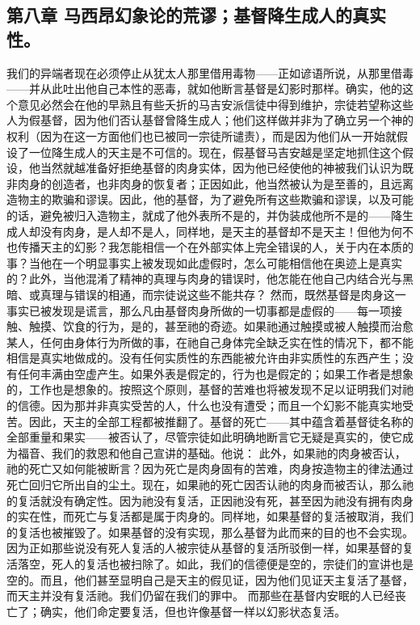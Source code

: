
\subsection{第八章 马西昂幻象论的荒谬；基督降生成人的真实性。}

我们的异端者现在必须停止从犹太人那里借用毒物——正如谚语所说，从那里借毒——并从此吐出他自己本性的恶毒，就如他断言基督是幻影时那样。确实，他的这个意见必然会在他的早熟且有些夭折的马吉安派信徒中得到维护，宗徒若望称这些人为假基督，因为他们否认基督曾降生成人；他们这样做并非为了确立另一个神的权利（因为在这一方面他们也已被同一宗徒所谴责），而是因为他们从一开始就假设了一位降生成人的天主是不可信的。现在，假基督马吉安越是坚定地抓住这个假设，他当然就越准备好拒绝基督的肉身实体，因为他已经使他的神被我们认识为既非肉身的创造者，也非肉身的恢复者；正因如此，他当然被认为是至善的，且远离造物主的欺骗和谬误。因此，他的基督，为了避免所有这些欺骗和谬误，以及可能的话，避免被归入造物主，就成了他外表所不是的，并伪装成他所不是的——降生成人却没有肉身，是人却不是人，同样地，是天主的基督却不是天主！但他为何不也传播天主的幻影？我怎能相信一个在外部实体上完全错误的人，关于内在本质的事？当他在一个明显事实上被发现如此虚假时，怎么可能相信他在奥迹上是真实的？此外，当他混淆了精神的真理与肉身的错误时，他怎能在他自己内结合光与黑暗、或真理与错误的相通，而宗徒说这些不能共存？ 然而，既然基督是肉身这一事实已被发现是谎言，那么凡由基督肉身所做的一切事都是虚假的——每一项接触、触摸、饮食的行为，是的，甚至祂的奇迹。如果祂通过触摸或被人触摸而治愈某人，任何由身体行为所做的事，在祂自己身体完全缺乏实在性的情况下，都不能相信是真实地做成的。没有任何实质性的东西能被允许由非实质性的东西产生；没有任何丰满由空虚产生。如果外表是假定的，行为也是假定的；如果工作者是想象的，工作也是想象的。按照这个原则，基督的苦难也将被发现不足以证明我们对祂的信德。因为那并非真实受苦的人，什么也没有遭受；而且一个幻影不能真实地受苦。因此，天主的全部工程都被推翻了。基督的死亡——其中蕴含着基督徒名称的全部重量和果实——被否认了，尽管宗徒如此明确地断言它无疑是真实的，使它成为福音、我们的救恩和他自己宣讲的基础。他说： 此外，如果祂的肉身被否认，祂的死亡又如何能被断言？因为死亡是肉身固有的苦难，肉身按造物主的律法通过死亡回归它所出自的尘土。现在，如果祂的死亡因否认祂的肉身而被否认，那么祂的复活就没有确定性。因为祂没有复活，正因祂没有死，甚至因为祂没有拥有肉身的实在性，而死亡与复活都是属于肉身的。同样地，如果基督的复活被取消，我们的复活也被摧毁了。如果基督的没有实现，那么基督为此而来的目的也不会实现。因为正如那些说没有死人复活的人被宗徒从基督的复活所驳倒一样，如果基督的复活落空，死人的复活也被扫除了。如此，我们的信德便是空的，宗徒们的宣讲也是空的。而且，他们甚至显明自己是天主的假见证，因为他们见证天主复活了基督，而天主并没有复活祂。我们仍留在我们的罪中。 而那些在基督内安眠的人已经丧亡了；确实，他们命定要复活，但也许像基督一样以幻影状态复活。\par

